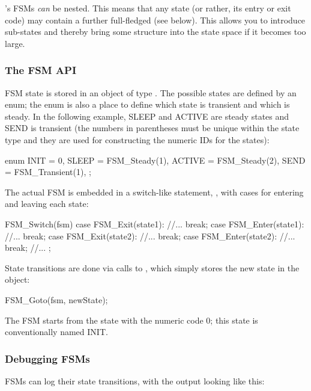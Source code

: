 {\opp}'s FSMs \textit{can} be nested. This means
that any state (or rather, its entry or exit code) may contain a
further full-fledged  (see below). This allows you
to introduce sub-states and thereby bring some structure into the
state space if it becomes too large.


\subsubsection{The FSM API}
\label{sec:simple-modules:fsm-api}

FSM state is stored in an object of type . The possible states
are defined by an enum; the enum is also a place to define which
state is transient and which is steady. In the following example, SLEEP
and ACTIVE are steady states and SEND is transient (the numbers
in parentheses must be unique within the state type and they are used
for constructing the numeric IDs for the states):

\begin{cpp}
enum {
  INIT = 0,
  SLEEP = FSM_Steady(1),
  ACTIVE = FSM_Steady(2),
  SEND = FSM_Transient(1),
};
\end{cpp}

The actual FSM is embedded in a switch-like statement, ,
with cases for entering and leaving each state:

\begin{cpp}
FSM_Switch(fsm)
{
  case FSM_Exit(state1):
    //...
    break;
  case FSM_Enter(state1):
    //...
    break;
  case FSM_Exit(state2):
    //...
    break;
  case FSM_Enter(state2):
    //...
    break;
  //...
};
\end{cpp}


State transitions are done via calls to , which simply stores
the new state in the  object:

\begin{cpp}
FSM_Goto(fsm, newState);
\end{cpp}

The FSM starts from the state with the numeric code 0; this state
is conventionally named INIT.


\subsubsection{Debugging FSMs}
\label{sec:simple-modules:debugging-fsms}

FSMs can log their state transitions, with the output looking like this:

